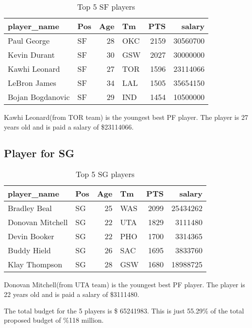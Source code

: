 \documentclass[
]{article}
\begin{document}
\begin{table}[!h]

\caption{\label{tab:unnamed-chunk-18}Top 5 SF players}
\centering
\begin{tabular}[t]{l|l|r|l|r|r}
\hline
player\_name & Pos & Age & Tm & PTS & salary\\
\hline
Paul George & SF & 28 & OKC & 2159 & 30560700\\
\hline
Kevin Durant & SF & 30 & GSW & 2027 & 30000000\\
\hline
Kawhi Leonard & SF & 27 & TOR & 1596 & 23114066\\
\hline
LeBron James & SF & 34 & LAL & 1505 & 35654150\\
\hline
Bojan Bogdanovic & SF & 29 & IND & 1454 & 10500000\\
\hline
\end{tabular}
\end{table}

Kawhi Leonard(from TOR team) is the youngest best PF player. The player
is 27 years old and is paid a salary of \$23114066.

\hypertarget{player-for-sg}{%
\subsection{Player for SG}\label{player-for-sg}}

\begin{table}[!h]

\caption{\label{tab:unnamed-chunk-19}Top 5 SG players}
\centering
\begin{tabular}[t]{l|l|r|l|r|r}
\hline
player\_name & Pos & Age & Tm & PTS & salary\\
\hline
Bradley Beal & SG & 25 & WAS & 2099 & 25434262\\
\hline
Donovan Mitchell & SG & 22 & UTA & 1829 & 3111480\\
\hline
Devin Booker & SG & 22 & PHO & 1700 & 3314365\\
\hline
Buddy Hield & SG & 26 & SAC & 1695 & 3833760\\
\hline
Klay Thompson & SG & 28 & GSW & 1680 & 18988725\\
\hline
\end{tabular}
\end{table}

Donovan Mitchell(from UTA team) is the youngest best PF player. The
player is 22 years old and is paid a salary of \$3111480.

The total budget for the 5 players is \$ 65241983. This is just 55.29\%
of the total proposed budget of \%118 million.
\end{document}
